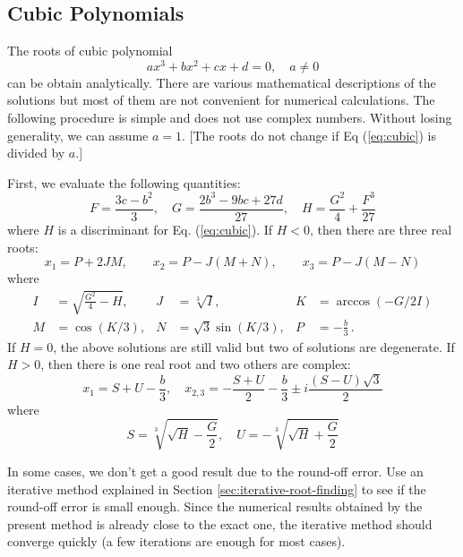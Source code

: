 \noindent
\subsection{Cubic Polynomials}\label{sec:roots_cubic}

The roots of cubic polynomial
\begin{equation}\label{eq:cubic}
a x^3 + b x^2 + c x + d = 0, \quad a \ne 0
\end{equation}
can be obtain analytically. There  are various mathematical descriptions of the solutions but most of them are not convenient for numerical calculations. The following procedure is simple and does not use complex numbers.\cite{cubic_roots} Without losing generality, we can assume $a=1$. [The roots do not change if Eq (\ref{eq:cubic}) is divided by $a$.]

First, we evaluate the following quantities: 
\begin{equation}
F  = \frac{3 c - b^2}{3}, \quad
G  = \frac{2 b^3 - 9 b c + 27 d}{27}, \quad
H  = \frac{G^2}{4} + \frac{F^3}{27}
\end{equation}
where $H$ is a discriminant for Eq. (\ref{eq:cubic}).
If $H<0$, then there are three real roots:
\begin{equation}
x_1 = P + 2 J M, \qquad
x_2 = P - J (M+N), \qquad
x_3 = P - J (M-N)
\end{equation}
where 
\begin{align}
I &= \sqrt{\frac{G^2}{4} - H}, & J &= \sqrt[3]{I}, &K &= \arccos(-G/2I) \nonumber\\
M &= \cos(K/3), & N &= \sqrt{3} \sin(K/3), & P &= -\frac{b}{3} \, .
\end{align}
If $H=0$, the above solutions are still valid but two of solutions are degenerate.
If $H>0$, then there is one real root and two others are complex:
\begin{equation}
x_1 = S+U-\frac{b}{3}, \quad x_{2,3} = -\frac{S+U}{2} - \frac{b}{3} \pm i \frac{(S-U)\sqrt{3}}{2}
\end{equation}
where
\begin{equation}
S = \sqrt[3]{\sqrt{H}-\frac{G}{2}}, \quad U =  -\sqrt[3]{\sqrt{H}+\frac{G}{2}}
\end{equation}

In some cases, we don't get a good result due to the round-off error.  Use an iterative method explained in Section \ref{sec:iterative-root-finding} to see if the round-off error is small enough. Since the numerical results obtained by the present method is already close to the exact one, the iterative method should converge quickly (a few iterations are enough for most cases).


